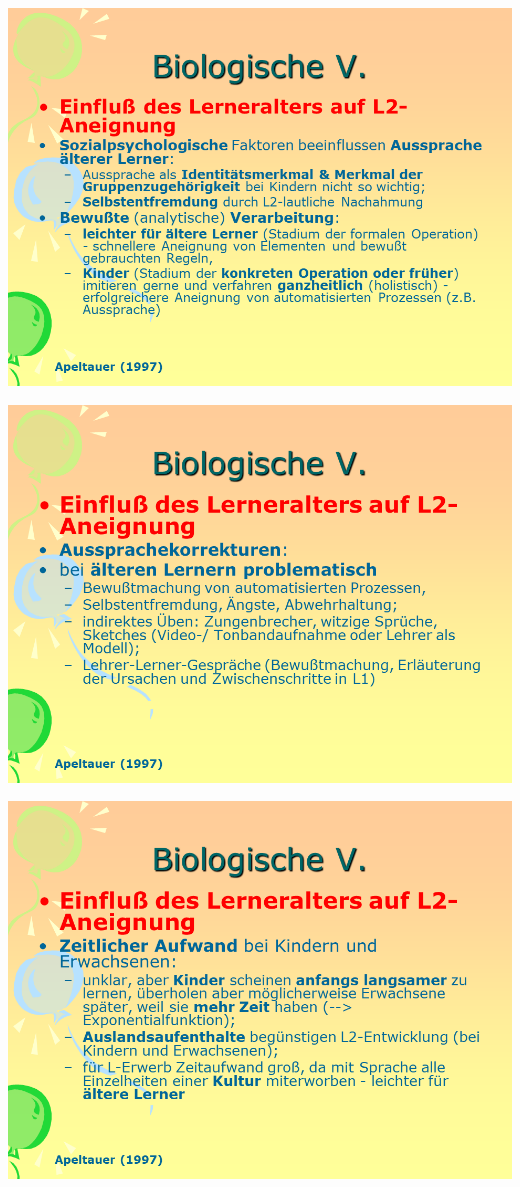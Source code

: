 \documentclass[
  letterpaper,
]{scrbook}
\begin{document}
\includegraphics[width=1\textwidth,height=\textheight]{./pictures/neuro/Diapozitiv81.PNG}

\includegraphics[width=1\textwidth,height=\textheight]{./pictures/neuro/Diapozitiv82.PNG}

\includegraphics[width=1\textwidth,height=\textheight]{./pictures/neuro/Diapozitiv83.PNG}
\end{document}
